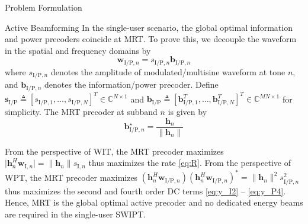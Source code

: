 \documentclass[journal]{IEEEtran}
\begin{document}
\begin{section}{Problem Formulation}
		\begin{subsection}{Active Beamforming}
			In the single-user scenario, the global optimal information and power precoders coincide at MRT. To prove this, we decouple the waveform in the spatial and frequency domains by
			\begin{equation}\label{eq:w}
				\boldsymbol{w}_{\mathrm{I/P}, n} = s_{\mathrm{I/P}, n} \boldsymbol{b}_{\mathrm{I/P}, n}
			\end{equation}
			where $s_{\mathrm{I/P},n}$ denotes the amplitude of modulated/multisine waveform at tone $n$, and $\boldsymbol{b}_{\mathrm{I/P}, n}$ denotes the information/power precoder. Define $\boldsymbol{s}_{\mathrm{I/P}} \triangleq [s_{\mathrm{I/P},1},\dots,s_{\mathrm{I/P},N}]^T \in \mathbb{C}^{N \times 1}$ and $\boldsymbol{b}_{\mathrm{I/P}} \triangleq [\boldsymbol{b}_{\mathrm{I/P}, 1}^T,\dots,\boldsymbol{b}_{\mathrm{I/P}, N}^T]^T \in \mathbb{C}^{MN \times 1}$ for simplicity. The MRT precoder at subband $n$ is given by
			\begin{equation}\label{eq:b}
				\boldsymbol{b}_{\mathrm{I/P}, n}^\star = \frac{\boldsymbol{h}_n}{\lVert{\boldsymbol{h}_n}\rVert}
			\end{equation}

			From the perspective of WIT, the MRT precoder maximizes $\lvert{\boldsymbol{h}_{n}^H \boldsymbol{w}_{\mathrm{I}, n}}\rvert = \lVert{\boldsymbol{h}_{n}}\rVert s_{\mathrm{I}, n}$ thus maximizes the rate \eqref{eq:R}. From the perspective of WPT, the MRT precoder maximizes $(\boldsymbol{h}_{n}^H \boldsymbol{w}_{\mathrm{I/P}, n})(\boldsymbol{h}_{n}^H \boldsymbol{w}_{\mathrm{I/P}, n})^* = \lVert{\boldsymbol{h}_{n}}\rVert^2 s_{\mathrm{I/P}, n}^2$ thus maximizes the second and fourth order DC terms \eqref{eq:y_I2} -- \eqref{eq:y_P4}. Hence, MRT is the global optimal active precoder and no dedicated energy beams are required in the single-user SWIPT.
		\end{subsection}



\end{section}
\end{document}
